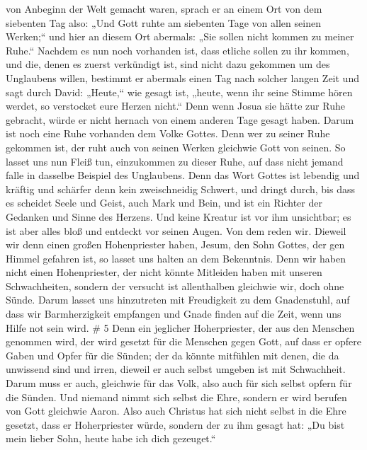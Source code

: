 von Anbeginn der Welt gemacht waren,  sprach er an einem Ort
von dem siebenten Tag also: „Und Gott ruhte am siebenten Tage von allen
seinen Werken;``  und hier an diesem Ort abermals: „Sie
sollen nicht kommen zu meiner Ruhe.``  Nachdem es nun noch
vorhanden ist, dass etliche sollen zu ihr kommen, und die, denen es
zuerst verkündigt ist, sind nicht dazu gekommen um des Unglaubens
willen,  bestimmt er abermals einen Tag nach solcher langen
Zeit und sagt durch David: „Heute,`` wie gesagt ist, „heute, wenn ihr
seine Stimme hören werdet, so verstocket eure Herzen nicht.``
 Denn wenn Josua sie hätte zur Ruhe gebracht, würde er nicht
hernach von einem anderen Tage gesagt haben.  Darum ist noch
eine Ruhe vorhanden dem Volke Gottes.  Denn wer zu seiner
Ruhe gekommen ist, der ruht auch von seinen Werken gleichwie Gott von
seinen.  So lasset uns nun Fleiß tun, einzukommen zu dieser
Ruhe, auf dass nicht jemand falle in dasselbe Beispiel des Unglaubens.
 Denn das Wort Gottes ist lebendig und kräftig und schärfer
denn kein zweischneidig Schwert, und dringt durch, bis dass es scheidet
Seele und Geist, auch Mark und Bein, und ist ein Richter der Gedanken
und Sinne des Herzens.  Und keine Kreatur ist vor ihm
unsichtbar; es ist aber alles bloß und entdeckt vor seinen Augen. Von
dem reden wir.  Dieweil wir denn einen großen Hohenpriester
haben, Jesum, den Sohn Gottes, der gen Himmel gefahren ist, so lasset
uns halten an dem Bekenntnis.  Denn wir haben nicht einen
Hohenpriester, der nicht könnte Mitleiden haben mit unseren
Schwachheiten, sondern der versucht ist allenthalben gleichwie wir, doch
ohne Sünde.  Darum lasset uns hinzutreten mit Freudigkeit
zu dem Gnadenstuhl, auf dass wir Barmherzigkeit empfangen und Gnade
finden auf die Zeit, wenn uns Hilfe not sein wird. \# 5 
Denn ein jeglicher Hoherpriester, der aus den Menschen genommen wird,
der wird gesetzt für die Menschen gegen Gott, auf dass er opfere Gaben
und Opfer für die Sünden;  der da könnte mitfühlen mit
denen, die da unwissend sind und irren, dieweil er auch selbst umgeben
ist mit Schwachheit.  Darum muss er auch, gleichwie für das
Volk, also auch für sich selbst opfern für die Sünden.  Und
niemand nimmt sich selbst die Ehre, sondern er wird berufen von Gott
gleichwie Aaron.  Also auch Christus hat sich nicht selbst
in die Ehre gesetzt, dass er Hoherpriester würde, sondern der zu ihm
gesagt hat: „Du bist mein lieber Sohn, heute habe ich dich gezeuget.``
